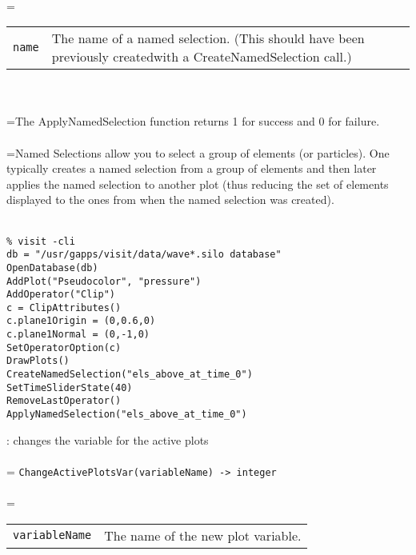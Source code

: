 \documentclass[10pt,a4paper]{report}
\begin{document}
 \\ 
\hangindent=\parindent 
\begin{tabular}{lp{9cm}}
\verb!name! & The name of a named selection.  (This should have been previously createdwith a CreateNamedSelection call.) \\
\end{tabular} \\[-2mm]


 \\ 
\hangindent=\parindent The ApplyNamedSelection function returns 1 for success and 0 for failure. \\[-3mm] 

 \\ 
\hangindent=\parindent Named Selections allow you to select a group of elements (or particles). One typically creates a named selection from a group of elements and then later applies the named selection to another plot (thus reducing the set of elements displayed to the ones from when the named selection was created). \\[-3mm] 

\\[-6mm]
\begin{verbatim}% visit -cli
db = "/usr/gapps/visit/data/wave*.silo database"
OpenDatabase(db)
AddPlot("Pseudocolor", "pressure")
AddOperator("Clip")
c = ClipAttributes()
c.plane1Origin = (0,0.6,0)
c.plane1Normal = (0,-1,0)
SetOperatorOption(c)
DrawPlots()
CreateNamedSelection("els_above_at_time_0")
SetTimeSliderState(40)
RemoveLastOperator()
ApplyNamedSelection("els_above_at_time_0")
\end{verbatim}
\newpage


{}
: changes the variable for the active plots\\[-3mm]

 \\ 
\hangindent=\parindent 
\verb!ChangeActivePlotsVar(variableName) -> integer!\\ [-3mm]

 \\ 
\hangindent=\parindent 
\begin{tabular}{ll}
\verb!variableName! & The name of the new plot variable. \\
\end{tabular} \\[-2mm]
\end{document}
